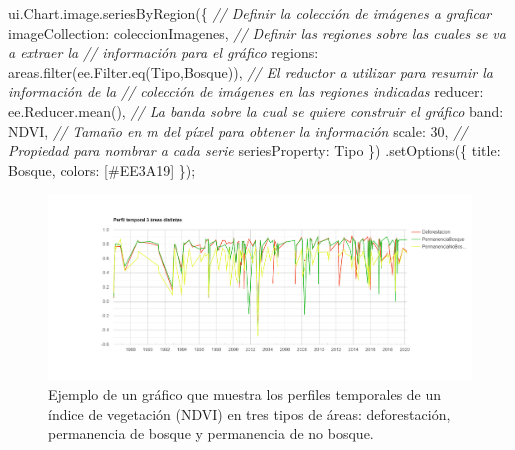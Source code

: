 \documentclass[
  12pt,
  letterpaper,
  twoside]{book}
\newenvironment{Shaded}{\begin{snugshade}}{\end{snugshade}}
\newcommand{\AttributeTok}[1]{\textcolor[rgb]{0.48,0.12,0.64}{#1}}
\newcommand{\CommentTok}[1]{\textcolor[rgb]{0.24,0.58,0.00}{\textit{#1}}}
\newcommand{\DataTypeTok}[1]{\textcolor[rgb]{0.00,0.00,0.00}{#1}}
\newcommand{\DecValTok}[1]{\textcolor[rgb]{0.28,0.53,0.93}{#1}}
\newcommand{\FunctionTok}[1]{\textcolor[rgb]{0.48,0.12,0.64}{#1}}
\newcommand{\KeywordTok}[1]{\textcolor[rgb]{0.48,0.12,0.64}{#1}}
\newcommand{\NormalTok}[1]{#1}
\newcommand{\OperatorTok}[1]{\textcolor[rgb]{0.00,0.00,0.00}{#1}}
\newcommand{\StringTok}[1]{\textcolor[rgb]{0.87,0.29,0.22}{#1}}
\begin{document}
\begin{Shaded}
\begin{Highlighting}[]
\KeywordTok{ui}\OperatorTok{.}\AttributeTok{Chart}\OperatorTok{.}\AttributeTok{image}\OperatorTok{.}\FunctionTok{seriesByRegion}\NormalTok{(\{}
  \CommentTok{// Definir la colección de imágenes a graficar}
  \DataTypeTok{imageCollection}\OperatorTok{:}\NormalTok{ coleccionImagenes}\OperatorTok{,} 
  \CommentTok{// Definir las regiones sobre las cuales se va a extraer la}
  \CommentTok{// información para el gráfico}
  \DataTypeTok{regions}\OperatorTok{:}\NormalTok{ areas}\OperatorTok{.}\FunctionTok{filter}\NormalTok{(}\KeywordTok{ee}\OperatorTok{.}\AttributeTok{Filter}\OperatorTok{.}\FunctionTok{eq}\NormalTok{(}\StringTok{\textquotesingle{}Tipo\textquotesingle{}}\OperatorTok{,}\StringTok{\textquotesingle{}Bosque\textquotesingle{}}\NormalTok{))}\OperatorTok{,}
  \CommentTok{// El reductor a utilizar para resumir la información de la}
  \CommentTok{// colección de imágenes en las regiones indicadas}
  \DataTypeTok{reducer}\OperatorTok{:} \KeywordTok{ee}\OperatorTok{.}\AttributeTok{Reducer}\OperatorTok{.}\FunctionTok{mean}\NormalTok{()}\OperatorTok{,} 
  \CommentTok{// La banda sobre la cual se quiere construir el gráfico}
  \DataTypeTok{band}\OperatorTok{:} \StringTok{\textquotesingle{}NDVI\textquotesingle{}}\OperatorTok{,} 
  \CommentTok{// Tamaño en m del píxel para obtener la información}
  \DataTypeTok{scale}\OperatorTok{:} \DecValTok{30}\OperatorTok{,} 
  \CommentTok{// Propiedad para nombrar a cada serie}
  \DataTypeTok{seriesProperty}\OperatorTok{:} \StringTok{\textquotesingle{}Tipo\textquotesingle{}}
\NormalTok{\})}
  \OperatorTok{.}\FunctionTok{setOptions}\NormalTok{(\{}
    \DataTypeTok{title}\OperatorTok{:} \StringTok{\textquotesingle{}Bosque\textquotesingle{}}\OperatorTok{,}
    \DataTypeTok{colors}\OperatorTok{:}\NormalTok{ [}\StringTok{\textquotesingle{}\#EE3A19\textquotesingle{}}\NormalTok{]}
\NormalTok{  \})}\OperatorTok{;}
\end{Highlighting}
\end{Shaded}

\begin{figure}[H]

{\centering \includegraphics[width=0.95\linewidth]{Img/chartEjemplo} 

}

\caption{Ejemplo de un gráfico que muestra los perfiles temporales de un índice de vegetación (NDVI) en tres tipos de áreas: deforestación, permanencia de bosque y permanencia de no bosque.}\label{fig:f34}
\end{figure}
\end{document}
